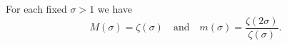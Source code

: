 For each fixed $\sigma > 1$ we have
$$M(\sigma) = \zeta(\sigma) \quad \text{and} \quad m(\sigma) = \frac{\zeta(2\sigma)}{\zeta(\sigma)}.$$
